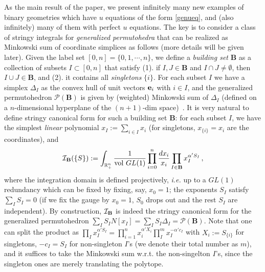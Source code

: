 \documentclass[hidelinks,12pt]{article}
\begin{document}
As the main result of the paper, we present infinitely many new examples of binary geometries which have $u$ equations of the form \eqref{genueq}, and (also infinitely) many of them with perfect $u$ equations. The key is to consider a class of stringy integrals for {\it generalized permutohedra} that can be realized as Minkowski sum of coordinate simplices as follows (more details will be given later). Given the label set $[0,n]=\{0,1,\cdots, n\}$, we define a {\it building set} $\mathbf B$ as a collection of subsets $I \subset [0,n]$ that satisfy (1). if $I, J \in {\mathbf B}$ and $I\cap J\neq \emptyset$, then $I\cup J \in {\mathbf B}$, and (2). it contains all {\it singletons} $\{i\}$. For each subset $I$ we have a simplex $\Delta_I$ as the convex hull of unit vectors ${\bf e}_i$ with $i\in I$, and the generalized permutohedron ${\mathscr P}(\mathbf B)$ is given by (weighted) Minkowski sum of $\Delta_I$ (defined on a $n$-dimensional hyperplane of the $(n{+}1)$-dim space)~\cite{}.  It is very natural to define stringy canonical form for such a building set $\mathbf B$: for each subset $I$, we have the simplest {\it linear} polynomial $x_I:=\sum_{i\in I} x_i$ (for singletons, $x_{\{i\}}=x_i$ are the coordinates), and
\begin{equation}\label{intgenperm}
{\cal I}_{\mathbf B}(\{S\}):=\int_{\mathbb R_+^n}\frac{1}{{\rm vol}~GL(1)} \prod_{i=0}^n \frac{d x_i}{x_i} %
\prod_{I \in {\mathbf B}} x_I^{\alpha' S_I}\,,
\end{equation}
where the integration domain is defined projectively, {\it i.e.} up to a $GL(1)$ redundancy which can be fixed by fixing, say, $x_0=1$; the exponents $S_I$ satisfy $\sum_I S_I=0$ (if we fix the gauge by $x_0=1$, $S_0$ drops out and the rest $S_I$ are independent). By construction, ${\cal I}_{\mathbf B}$ is indeed the stringy canonical form for the generalized permutohedron $\sum_I S_I N[x_I]=\sum_I S_I \Delta_I={\mathscr P}(\mathbf B)$. Note that one can split the product as $\prod_I x_I^{\alpha' S_I}=\prod_{i=1}^n x_i^{\alpha' X_i} \prod_I^m x_I^{-\alpha' c_I}$ with $X_i:=S_{\{i\}}$ for singletons, $-c_I=S_I$ for non-singleton $I$'s (we denote their total number as $m$), and it suffices to take the Minkowski sum w.r.t. the non-singelton $I$'s, since the singleton ones are merely translating the polytope. 
\end{document}
